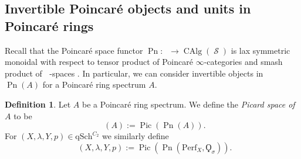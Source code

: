 \documentclass{article}
\DeclareMathOperator{\CAlg}{CAlg} %
\DeclareMathOperator{\Catp}{Cat^p_\infty} %
\DeclareMathOperator{\Einfty}{\mathbf{E}_\infty} %
\DeclareMathOperator{\Pic}{Pic} %
\DeclareMathOperator{\Picp}{Pic^p} %
\DeclareMathOperator{\Pn}{Pn} %
\DeclareMathOperator{\Spaces}{\mathcal{S}} %
\newcommand{\perf}{\mathrm{Perf}}
\theoremstyle{definition}
\newtheorem{definition}[equation]{Definition}
\begin{document}
\subsection{Invertible Poincaré objects and units in Poincaré rings}
Recall that the Poincaré space functor $ \Pn \colon \Catp \to \CAlg(\Spaces) $ is lax symmetric monoidal with respect to tensor product of Poincaré $ \infty $-categories and smash product of $ \Einfty $-spaces \cite[Corollary 5.2.8]{CDHHLMNNSI}. In particular, we can consider invertible objects in $\Pn(A)$ for a Poincaré ring spectrum $A$.

\begin{definition}
    \label{definition:poincare_picard_space}
    Let $A$ be a Poincaré ring spectrum. We define the \emph{Picard space of $A$} to be $$\Picp(A):=\Pic(\Pn(A)).$$
    For $(X,\lambda, Y, p)\in \mathrm{qSch}^{C_2}$ we similarly define \[\Picp(X,\lambda,Y,p):= \Pic(\Pn(\perf_X,\Qoppa_{\sigma})).\]
\end{definition}
\end{document}
